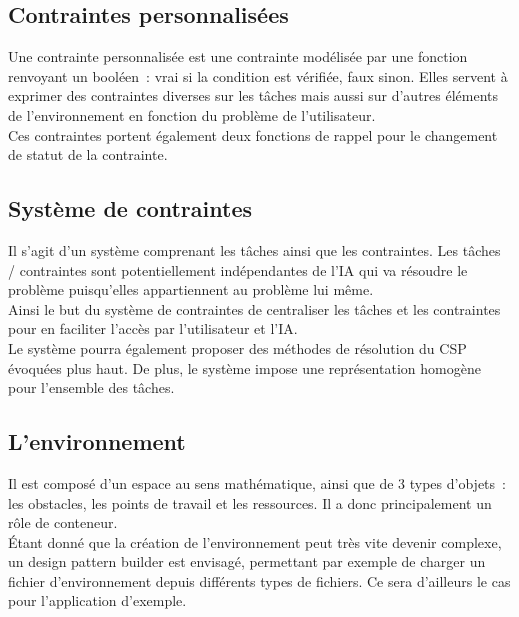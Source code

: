 \subsection*{Contraintes personnalisées}

Une contrainte personnalisée est une contrainte modélisée par une fonction renvoyant un booléen~: vrai si la condition est vérifiée, faux sinon.
Elles servent à exprimer des contraintes diverses sur les tâches mais aussi sur d'autres éléments de l'environnement en fonction du problème de l'utilisateur.\\

Ces contraintes portent également deux fonctions de rappel pour le changement de statut de la contrainte.

\subsection*{Système de contraintes}
Il s'agit d'un système comprenant les tâches ainsi que les contraintes. Les  tâches / contraintes sont potentiellement indépendantes de l'IA qui va résoudre le problème puisqu'elles appartiennent au problème lui même.\\

Ainsi le but du système de contraintes de centraliser les tâches et les contraintes pour en faciliter l'accès par l'utilisateur et l'IA.\\
\indent Le système pourra également proposer des méthodes de résolution du CSP évoquées plus haut.
De plus, le système impose une représentation homogène pour l'ensemble des tâches.\\

{\color{blue}{
\noindent Schéma de classes du système.\\
Schéma d’interaction avec l'utilisateur.\\
Schéma d’interaction avec l'IA.
}}

\subsection*{L'environnement}

Il est composé d'un espace au sens mathématique, ainsi que de 3 types d'objets~: les obstacles, les points de travail et les ressources. Il a donc principalement un rôle de conteneur.\\

\'Etant donné que la création de l'environnement peut très vite devenir complexe, un design pattern builder est envisagé, permettant par exemple de charger un fichier d'environnement depuis différents types de fichiers.
Ce sera d'ailleurs le cas pour l'application d'exemple.\\\\

